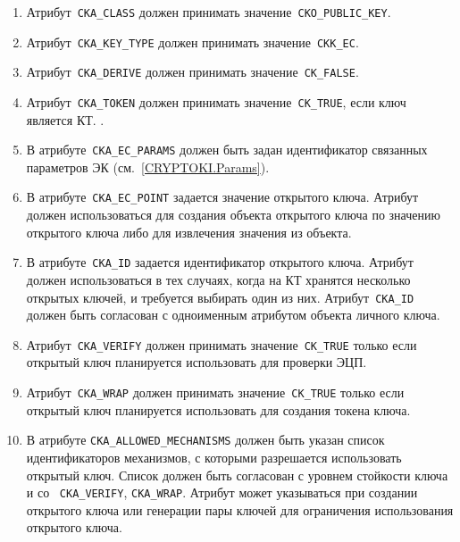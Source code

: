 \begin{enumerate}
\item
Атрибут~\verb|CKA_CLASS| должен принимать значение~\verb|CKO_PUBLIC_KEY|.

\item
Атрибут~\verb|CKA_KEY_TYPE| должен принимать значение~\verb|CKK_EC|.

\item
Атрибут~\verb|CKA_DERIVE| должен принимать значение~\verb|CK_FALSE|.

\item
Атрибут~\verb|CKA_TOKEN| должен принимать значение~\verb|CK_TRUE|,
если ключ является  КТ. 
%
.

\item
В атрибуте~\verb|CKA_EC_PARAMS| должен быть задан идентификатор связанных 
параметров ЭК (см.~\ref{CRYPTOKI.Params}).

\item
В атрибуте~\verb|CKA_EC_POINT| задается значение открытого ключа. 
Атрибут должен использоваться для создания объекта открытого ключа 
по значению открытого ключа либо для извлечения значения из объекта. 

\item
В атрибуте~\verb|CKA_ID| задается идентификатор открытого ключа. 
Атрибут должен использоваться в тех случаях, когда на КТ  
хранятся несколько открытых ключей, и требуется выбирать один из них. 
%
Атрибут~\verb|CKA_ID| должен быть согласован с одноименным атрибутом 
объекта личного ключа.

\item
Атрибут~\verb|CKA_VERIFY| должен принимать значение~\verb|CK_TRUE| 
только если открытый ключ планируется использовать для проверки ЭЦП.

\item
Атрибут~\verb|CKA_WRAP| должен принимать значение~\verb|CK_TRUE|
только если открытый ключ планируется использовать для создания
токена ключа.

\item
В атрибуте \verb|CKA_ALLOWED_MECHANISMS| должен быть указан список 
идентификаторов механизмов, с которыми разрешается использовать открытый 
ключ. Список должен быть согласован с уровнем стойкости ключа и со 
~\verb|CKA_VERIFY|, \verb|CKA_WRAP|. 
%
Атрибут может указываться при создании 
открытого ключа или генерации пары ключей для ограничения использования 
открытого ключа.
\end{enumerate}
 
